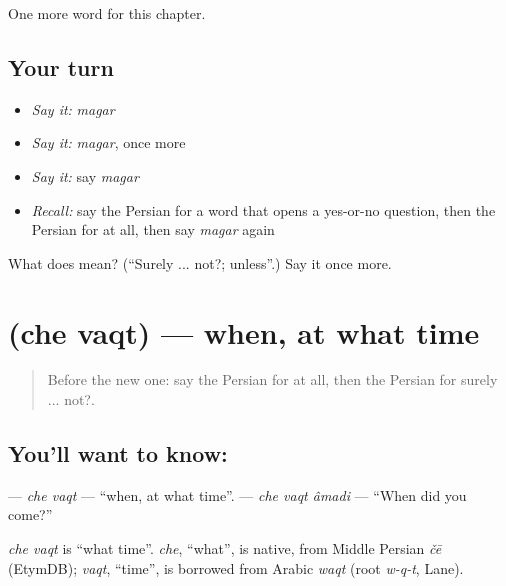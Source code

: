 \begin{grammarlens}[title={What you've built}]
One more word for this chapter.
\end{grammarlens}

\subsection*{Your turn}
\begin{itemize}
\raggedright
  \item \emph{Say it:} \emph{magar}
  \item \emph{Say it:} \emph{magar}, once more
  \item \emph{Say it:} say \emph{magar}
  \item \emph{Recall:} say the Persian for a word that opens a yes-or-no question, then the Persian for at all, then say \emph{magar} again
\end{itemize}

\begin{tcolorbox}[breakable,colback=teal!4,colframe=teal!35!black,title={Before you move on}]
What does  mean? (\textquotedblleft{}Surely ... not?; unless\textquotedblright{}.) Say it once more.
\end{tcolorbox}
\section[\texorpdfstring{\fa{چه} \fa{وقت} (che vaqt)}{چه وقت (che vaqt)}]{  (che vaqt) — when, at what time}

\label{lesson:FA-C136-che-vaqt}



\begin{quote}
Before the new one: say the Persian for at all, then the Persian for surely ... not?.
\end{quote}

\subsection*{You'll want to know:  }
\textbf{ } — \emph{che vaqt} — \textquotedblleft{}when, at what time\textquotedblright{}. \textbf{  } — \emph{che vaqt âmadi} — \textquotedblleft{}When did you come?\textquotedblright{}

\begin{cousinweb}
\emph{che vaqt} is \textquotedblleft{}what time\textquotedblright{}. \emph{che}, \textquotedblleft{}what\textquotedblright{}, is native, from Middle Persian \emph{čē} (EtymDB); \emph{vaqt}, \textquotedblleft{}time\textquotedblright{}, is borrowed from Arabic \emph{waqt} (root \emph{w-q-t}, Lane).
\end{cousinweb}

